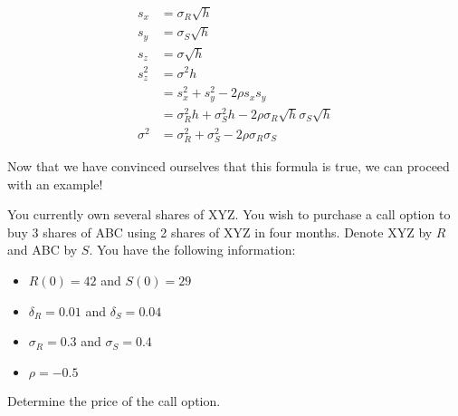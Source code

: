 \documentclass{ximera}
\begin{document}
\begin{align*}
s_x 		&=\sigma_R\sqrt{h}\\
s_y 		&=\sigma_S\sqrt{h}\\
s_z 		&=\sigma\sqrt{h}\\
s_z^2 	&=\sigma^2 h\\
		&=s_x^2+s_y^2-2\rho s_xs_y\\
		&=\sigma_R^2 h+\sigma_S^2 h-2\rho \sigma_R\sqrt{h}\sigma_S\sqrt{h}\\
\sigma^2 	&=\sigma_R^2+\sigma_S^2-2\rho\sigma_R\sigma_S
\end{align*}

Now that we have convinced ourselves that this formula is true, we can proceed with an example!

\begin{example}
You currently own several shares of XYZ. You wish to purchase a call option to buy 3 shares of ABC using 2 shares of XYZ in four months. Denote XYZ by $R$ and ABC by $S$. You have the following information:

	\begin{itemize}
	\item $R(0)=42$ and $S(0)=29$
	\item $\delta_R=0.01$ and $\delta_S=0.04$\\
	\item $\sigma_R=0.3$ and $\sigma_S=0.4$\\
	\item $\rho=-0.5$
	\end{itemize}

Determine the price of the call option.
\end{example}
\end{document}
